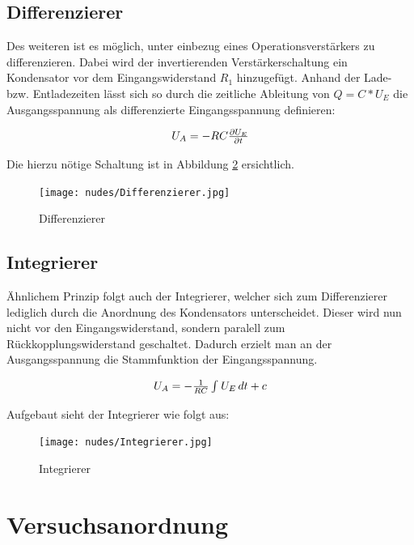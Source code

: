 \documentclass[12pt,a4paper,twoside]{article}
\begin{document}
\subsection{Differenzierer}

Des weiteren ist es möglich, unter einbezug eines Operationsverstärkers zu differenzieren. Dabei wird der invertierenden Verstärkerschaltung ein Kondensator vor dem Eingangswiderstand $R_{1}$ hinzugefügt. Anhand der Lade- bzw. Entladezeiten lässt sich so durch die zeitliche Ableitung von $Q = C*U_{E}$ die Ausgangsspannung als differenzierte Eingangsspannung definieren:

\begin{equation}
    \label{eq:DifferenziererAusgang}
    \centerline{$U_{A}=-RC \frac{\partial U_{E}}{\partial t}$}
\end{equation}

\noindent
Die hierzu nötige Schaltung ist in Abbildung \ref{fig:Integrierer} ersichtlich.

\begin{figure}[H]
    \centering
    \texttt{[image: nudes/Differenzierer.jpg]}
    \caption{Differenzierer \cite{teachcenter2}}
    \label{fig:Differenzierer}
\end{figure}


\subsection{Integrierer}

Ähnlichem Prinzip folgt auch der Integrierer, welcher sich zum Differenzierer lediglich durch die Anordnung des Kondensators unterscheidet. Dieser wird nun nicht vor den Eingangswiderstand, sondern paralell zum Rückkopplungswiderstand geschaltet.
Dadurch erzielt man an der Ausgangsspannung die Stammfunktion der Eingangsspannung.

\begin{equation}
    \label{eq:IntegriererAusgang}
    \centerline{$U_{A}=-\frac{1}{RC} \int_{}^{} U_{E} \,dt + c $}
\end{equation}

\noindent
Aufgebaut sieht der Integrierer wie folgt aus:

\begin{figure}[H]
    \centering
    \texttt{[image: nudes/Integrierer.jpg]}
    \caption{Integrierer \cite{teachcenter2}}
    \label{fig:Integrierer}
\end{figure}


\section{Versuchsanordnung} %
\end{document}
